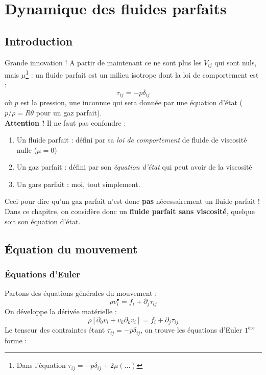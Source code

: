 \chapter{Dynamique des fluides parfaits}

\section{Introduction}
Grande innovation ! A partir de maintenant ce ne sont plus les $V_{ij}$ qui sont 
nuls, mais $\mu$\footnote{Dans l'équation $\tau_{ij} = -p\delta_{ij} + 2\mu
(\dots)$} : un fluide parfait est un milieu isotrope dont la loi de comportement 
est :
\begin{equation}
\tau_{ij} = -p\delta_{ij}
\end{equation}
où $p$ est la pression, une inconnue qui sera donnée par une équation d'état (
$p/\rho = R\theta$ pour un gaz parfait).\\
\textbf{Attention !} Il ne faut pas confondre :
\begin{enumerate}
\item Un fluide parfait : défini par sa \textit{loi de comportement} de fluide de
viscosité nulle ($\mu = 0$)
\item Un gaz parfait : défini par son \textit{équation d'état} qui peut avoir de
la viscosité
\item Un gars parfait : moi, tout simplement.
\end{enumerate}
Ceci pour dire qu'un gaz parfait n'est donc \textbf{pas} nécessairement un fluide
parfait ! Dans ce chapitre, on considère donc un \textbf{fluide parfait sans 
viscosité}, quelque soit son équation d'état.


\section{Équation du mouvement}
	\subsection{Équations d'Euler}
	Partons des équations générales du mouvement :
	\begin{equation}
	\rho v_i^\bullet = f_i + \partial_j \tau_{ij}
	\end{equation}
	On développe la dérivée matérielle :
	\begin{equation}
	\rho[\partial_0v_i + v_k\partial_kv_i] = f_i + \partial_j\tau_{ij}
	\end{equation}
	Le tenseur des contraintes étant $\tau_{ij} = -p\delta_{ij}$, on trouve les
	équations d'Euler $1^{\text{ère}}$ forme :\\
	
